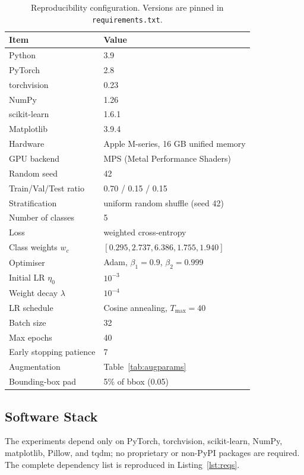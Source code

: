 \documentclass[conference,10pt]{IEEEtran}
\begin{document}
\begin{table}[h]
\centering
\caption{Reproducibility configuration. Versions are pinned in
\texttt{requirements.txt}.}
\label{tab:repro}
\renewcommand{\arraystretch}{1.15}
\begin{tabular}{ll}
\toprule
\textbf{Item} & \textbf{Value} \\
\midrule
Python                  & 3.9 \\
PyTorch                 & 2.8 \\
torchvision             & 0.23 \\
NumPy                   & 1.26 \\
scikit-learn            & 1.6.1 \\
Matplotlib              & 3.9.4 \\
Hardware                & Apple M-series, 16 GB unified memory \\
GPU backend             & MPS (Metal Performance Shaders) \\
Random seed             & 42 \\
Train/Val/Test ratio    & 0.70 / 0.15 / 0.15 \\
Stratification          & uniform random shuffle (seed 42) \\
Number of classes       & 5 \\
Loss                    & weighted cross-entropy \\
Class weights $w_c$     & $[0.295,2.737,6.386,1.755,1.940]$ \\
Optimiser               & Adam, $\beta_1{=}0.9$, $\beta_2{=}0.999$ \\
Initial LR $\eta_0$     & $10^{-3}$ \\
Weight decay $\lambda$  & $10^{-4}$ \\
LR schedule             & Cosine annealing, $T_{\max}=40$ \\
Batch size              & 32 \\
Max epochs              & 40 \\
Early stopping patience & 7 \\
Augmentation            & Table~\ref{tab:augparams} \\
Bounding-box pad        & 5\% of bbox (0.05) \\
\bottomrule
\end{tabular}
\end{table}

\subsection{Software Stack}
The experiments depend only on PyTorch, torchvision, scikit-learn, NumPy,
matplotlib, Pillow, and tqdm; no proprietary or non-PyPI packages are
required. The complete dependency list is reproduced in
Listing~\ref{lst:reqs}.
\end{document}
